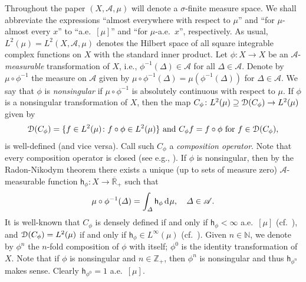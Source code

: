 \documentclass[draft,reqno]{amsproc}
\numberwithin{equation}{section}
\theoremstyle{remark}
\theoremstyle{definition}
\begin{document}
Throughout the paper $(X,{\mathscr A}, \mu)$ will denote a
$\sigma$-finite measure space. We shall abbreviate the
expressions ``almost everywhere with respect to
$\mu$'' and ``for $\mu$-almost every $x$'' to ``a.e.\
$[\mu]$'' and ``for $\mu$-a.e.\ $x$'', respectively.
As usual, $L^2(\mu)=L^2(X,{\mathscr A}, \mu)$ denotes the
Hilbert space of all square integrable complex
functions on $X$ with the standard inner product. Let
$\phi\colon X \to X$ be an ${\mathscr A}$-{\em measurable}
transformation of $X$, i.e., $\phi^{-1}(\varDelta) \in
{\mathscr A}$ for all $\varDelta \in {\mathscr A}$. Denote by
$\mu\circ \phi^{-1}$ the measure on ${\mathscr A}$ given by
$\mu\circ \phi^{-1}(\varDelta) =
\mu(\phi^{-1}(\varDelta))$ for $\varDelta \in {\mathscr A}$.
We say that $\phi$ is {\em nonsingular} if $\mu\circ
\phi^{-1}$ is absolutely continuous with respect to
$\mu$. If $\phi$ is a nonsingular transformation of
$X$, then the map $C_\phi\colon L^2(\mu) \supseteq
{{\EuScript D}({C_\phi})}\to L^2(\mu)$ given by
   \begin{align*}
{{\EuScript D}({C_\phi})} = \{f \in L^2(\mu) \colon f \circ \phi \in
L^2(\mu)\} \text{ and } C_\phi f = f \circ \phi \text{
for } f \in {{\EuScript D}({C_\phi})},
   \end{align*}
is well-defined (and vice versa). Call such $C_\phi$ a
{\em composition operator}. Note that every
composition operator is closed (see e.g.,
\cite[Proposition 3.2]{b-j-j-sC}). If $\phi$ is
nonsingular, then by the Radon-Nikodym theorem there
exists a unique (up to sets of measure zero)
${\mathscr A}$-measurable function $\mathsf {\mathsf h}_\phi \colon
X \to {{\overline{\mathbb R}_+}}$ such that
   \begin{align} \label{hfi}
\mu\circ \phi^{-1}(\varDelta) = \int_\varDelta
{\mathsf h}_\phi \operatorname{d\hspace{-0.25ex}}\mu, \quad \varDelta \in {\mathscr A}.
   \end{align}
It is well-known that $C_{\phi}$ is densely defined if
and only if ${\mathsf h}_{\phi} < \infty$ a.e.\ $[\mu]$ (cf.\
\cite[Lemma 6.1]{ca-hor}), and
${{\EuScript D}({C_{\phi}})}=L^2(\mu)$ if and only if ${\mathsf h}_{\phi}
\in L^\infty(\mu)$ (cf.\ \cite[Theorem 1]{nor}). Given
$n \in {\mathbb N}$, we denote by $\phi^n$ the $n$-fold
composition of $\phi$ with itself; $\phi^0$ is the
identity transformation of $X$. Note that if $\phi$ is
nonsingular and $n\in {\mathbb Z}_+$, then $\phi^n$ is
nonsingular and thus ${\mathsf h}_{\phi^n}$ makes sense.
Clearly ${\mathsf h}_{\phi^0}=1$ a.e.\ $[\mu]$.
\end{document}
